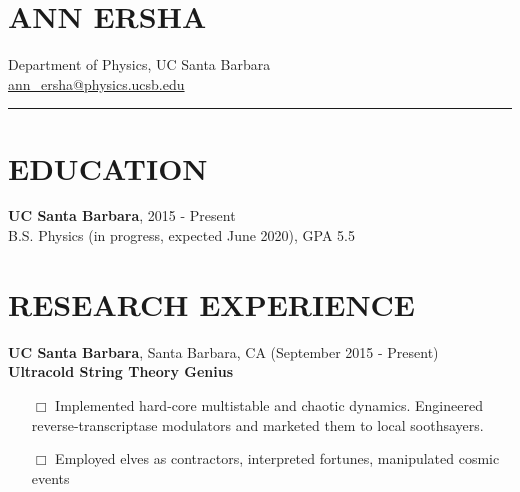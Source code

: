 \documentclass[11pt]{res} %
\begin{document}
 
    
    \fancyhf{}
    \renewcommand{\headrulewidth}{0pt}
    \fancyfoot[C]{\thepage}
    \pagestyle{fancy}
    \thispagestyle{plain}

                        
\begin{resume}                         

    \vspace{-0.5cm} {\LARGE{\section{ANN ERSHA} } } Department of Physics,
    UC Santa Barbara \\
    \href{ann\_ersha@physics.ucsb.edu}{ann\_ersha@physics.ucsb.edu}

\vspace{-3mm}         
\hspace{-12.5mm}\noindent\rule{9cm}{0.4pt}
\vspace{-4mm} 
\section{EDUCATION} 
    \textbf{UC Santa Barbara}, 2015 - Present \\
    B.S. Physics (in progress, expected June 2020), GPA 5.5
    
\section{RESEARCH EXPERIENCE}
\textbf{UC Santa Barbara}, Santa Barbara, CA (September 2015 - Present) \\ 
\textbf{Ultracold String Theory Genius} \\
\begin{itemize} \itemsep -2pt
\item[$\Box$] Implemented hard-core multistable and chaotic dynamics.
    Engineered reverse-transcriptase modulators and marketed them to local
        soothsayers.
\item[$\Box$] Employed elves as contractors, interpreted fortunes,
    manipulated cosmic events
\end{itemize}


\end{resume}
\end{document}
